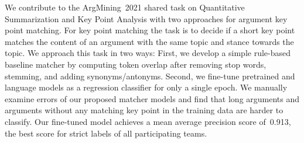 We contribute to the ArgMining~2021 shared task on Quantitative Summarization and Key Point Analysis with two approaches for argument key point matching.
For key point matching the task is to decide if a short key point matches the content of an argument with the same topic and stance towards the topic.
We approach this task in two ways:
First, we develop a simple rule-based baseline matcher by computing token overlap after removing stop words, stemming, and adding synonyms/antonyms.
Second, we fine-tune pretrained \Bert and \Roberta language models as a regression classifier for only a single epoch.
We manually examine errors of our proposed matcher models and find that long arguments and arguments without any matching key point in the training data are harder to classify.
Our fine-tuned \RobertaBase model achieves a mean average precision score of~0.913, the best score for strict labels of all participating teams.
